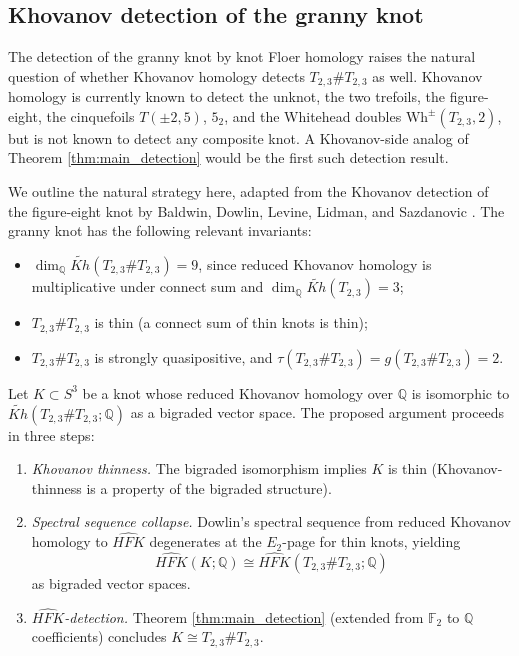 \subsection{Khovanov detection of the granny knot}

The detection of the granny knot by knot Floer homology raises the natural question of whether Khovanov homology detects $T_{2,3}\# T_{2,3}$ as well. Khovanov homology is currently known to detect the unknot, the two trefoils, the figure-eight, the cinquefoils $T(\pm 2,5)$, $5_2$, and the Whitehead doubles $\mathrm{Wh}^\pm(T_{2,3},2)$, but is not known to detect any composite knot. A Khovanov-side analog of Theorem \ref{thm:main_detection} would be the first such detection result.

We outline the natural strategy here, adapted from the Khovanov detection of the figure-eight knot by Baldwin, Dowlin, Levine, Lidman, and Sazdanovic \cite{BaldwinDowlinLevineLidmanSazdanovic2021}. The granny knot has the following relevant invariants:
\begin{itemize}
    \item $\dim_{\mathbb{Q}} \widetilde{Kh}(T_{2,3}\# T_{2,3}) = 9$, since reduced Khovanov homology is multiplicative under connect sum and $\dim_{\mathbb{Q}} \widetilde{Kh}(T_{2,3}) = 3$;
    \item $T_{2,3}\# T_{2,3}$ is thin (a connect sum of thin knots is thin);
    \item $T_{2,3}\# T_{2,3}$ is strongly quasipositive, and $\tau(T_{2,3}\# T_{2,3}) = g(T_{2,3}\# T_{2,3}) = 2$.
\end{itemize}

Let $K \subset S^3$ be a knot whose reduced Khovanov homology over $\mathbb{Q}$ is isomorphic to $\widetilde{Kh}(T_{2,3}\# T_{2,3};\mathbb{Q})$ as a bigraded vector space. The proposed argument proceeds in three steps:

\begin{enumerate}
    \item \emph{Khovanov thinness.} The bigraded isomorphism implies $K$ is thin (Khovanov-thinness is a property of the bigraded structure).

    \item \emph{Spectral sequence collapse.} Dowlin's spectral sequence \cite{Dowlin2024} from reduced Khovanov homology to $\widehat{HFK}$ degenerates at the $E_2$-page for thin knots, yielding
    \[
    \widehat{HFK}(K;\mathbb{Q}) \cong \widehat{HFK}(T_{2,3}\#T_{2,3};\mathbb{Q})
    \]
    as bigraded vector spaces.

    \item \emph{$\widehat{HFK}$-detection.} Theorem \ref{thm:main_detection} (extended from $\mathbb{F}_2$ to $\mathbb{Q}$ coefficients) concludes $K \cong T_{2,3}\# T_{2,3}$.
\end{enumerate}

